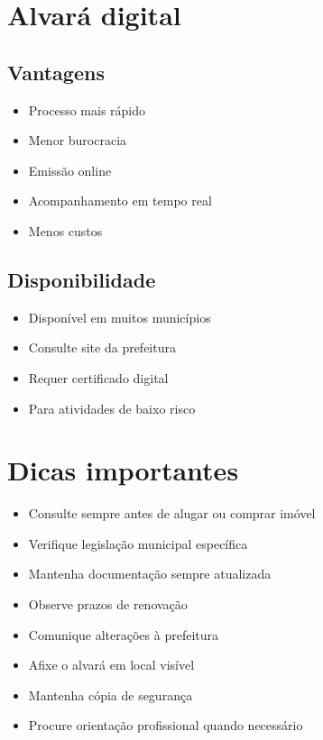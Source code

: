 \documentclass[12pt,a4paper]{article}
\begin{document}
\section{Alvará digital}

\subsection{Vantagens}
\begin{itemize}
    \item Processo mais rápido
    \item Menor burocracia
    \item Emissão online
    \item Acompanhamento em tempo real
    \item Menos custos
\end{itemize}

\subsection{Disponibilidade}
\begin{itemize}
    \item Disponível em muitos municípios
    \item Consulte site da prefeitura
    \item Requer certificado digital
    \item Para atividades de baixo risco
\end{itemize}

\section{Dicas importantes}

\begin{itemize}
    \item Consulte sempre antes de alugar ou comprar imóvel
    \item Verifique legislação municipal específica
    \item Mantenha documentação sempre atualizada
    \item Observe prazos de renovação
    \item Comunique alterações à prefeitura
    \item Afixe o alvará em local visível
    \item Mantenha cópia de segurança
    \item Procure orientação profissional quando necessário
\end{itemize}
\end{document}
